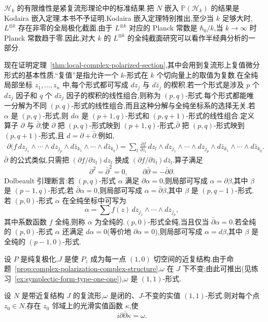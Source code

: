 $\mathcal H_k$ 的有限维性是紧复流形理论中的标准结果.把 $N$ 嵌入 $\mathbb P(\mathcal H_k)$ 的结果是 Kodaira 嵌入定理,本书不予证明.Kodaira 嵌入定理特别推出,至少当 $k$ 足够大时,$L^{\otimes k}$ 存在非零的全局极化截面.由于 $L^{\otimes k}$ 对应的 Planck 常数是 $\hbar_0/k$,当 $k\to\infty$ 时 Planck 常数趋于零.因此,对大 $k$ 的 $L^{\otimes k}$ 的全纯截面研究可以看作半经典分析的一部分.

现在证明定理~\ref{thm:local-complex-polarized-section},其中会用到复流形上复值微分形式的基本性质.“复值”是指允许一个 $k$-形式在 $k$ 个切向量上的取值为复数.在全纯局部坐标 $z_1,\ldots,z_n$ 中,每个形式都可写成 $dz_j$ 与 $d\bar z_j$ 的楔积.若一个形式是涉及 $p$ 个 $dz_j$ 因子和 $q$ 个 $d\bar z_j$ 因子的楔积的线性组合,则称为 $(p,q)$-形式.每个形式都能唯一分解为不同 $(p,q)$-形式的线性组合,而且这种分解与全纯坐标系的选择无关.若 $\alpha$ 是 $(p,q)$-形式,则 $d\alpha$ 是 $(p+1,q)$-形式和 $(p,q+1)$-形式的线性组合.定义算子 $\partial$ 与 $\bar\partial$,使 $\partial$ 把 $(p,q)$-形式映到 $(p+1,q)$-形式,$\bar\partial$ 把 $(p,q)$-形式映到 $(p,q+1)$-形式,且 $d=\partial+\bar\partial$.例如,
\[
\begin{aligned}
 \partial\bigl(f\,dz_{j_1}\wedge\cdots\wedge dz_{j_p}
 \wedge d\bar z_{k_1}\wedge\cdots\wedge d\bar z_{k_q}\bigr)
 =\sum_l\frac{\partial f}{\partial z_l}\,dz_l\wedge dz_{j_1}\wedge\cdots\wedge dz_{j_p}
 \wedge d\bar z_{k_1}\wedge\cdots\wedge d\bar z_{k_q}.
\end{aligned}
\]
$\bar\partial$ 的公式类似,只需把 $(\partial f/\partial z_l)dz_l$ 换成 $(\partial f/\partial\bar z_l)d\bar z_l$.算子满足
\[
 \partial^2=\bar\partial^2=0,
 \qquad
 \partial\bar\partial=-\bar\partial\partial.
\]
Dolbeault 引理断言:若 $(p,q)$-形式 $\alpha$ 满足 $\partial\alpha=0$,则局部可写成 $\alpha=\partial\beta$,其中 $\beta$ 是 $(p-1,q)$-形式;若 $\bar\partial\alpha=0$,则局部可写成 $\alpha=\bar\partial\beta$,其中 $\beta$ 是 $(p,q-1)$-形式.若 $(p,0)$-形式 $\alpha$ 在全纯坐标中可写为
\[
 \alpha=\sum f(z)\,dz_{j_1}\wedge\cdots\wedge dz_{j_p},
\]
其中系数函数 $f$ 全纯,则称 $\alpha$ 为全纯的.$(p,0)$-形式全纯,当且仅当 $\bar\partial\alpha=0$.若全纯的 $(p,0)$-形式 $\alpha$ 还满足 $d\alpha=0$(等价地 $\partial\alpha=0$),则局部可写成 $\alpha=d\beta$,其中 $\beta$ 是全纯的 $(p-1,0)$-形式.

设 $P$ 是纯复极化,$J$ 是使 $P_z$ 成为每一点 $(1,0)$ 切空间的近复结构.由于命题~\ref{prop:complex-polarization-complex-structure},$\omega$ 在 $J$ 下不变;由此可推出(见练习~\ref{ex:symplectic-form-type-one-one}),$\omega$ 是 $(1,1)$-形式.

\begin{lemma}[局部 Kähler 势]
\label{lem:kahler-potential}
设 $N$ 是带近复结构 $J$ 的复流形,$\omega$ 是闭的、$J$-不变的实值 $(1,1)$-形式.则对每个点 $z_0\in N$,存在 $z_0$ 邻域上的光滑实值函数 $\kappa$,使
\[
 i\partial\bar\partial\kappa=\omega.
 \label{eq:kahler-potential}
\]
\end{lemma}

